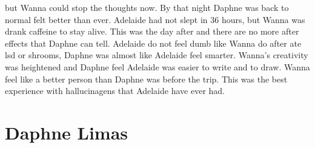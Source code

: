 \documentclass[12pt]{book}
\begin{document}
but Wanna could stop the thoughts now. By that night Daphne was back to normal felt better than ever. Adelaide had not slept in 36 hours, but Wanna was drank caffeine to stay alive. This was the day after and there are no more after effects that Daphne can tell. Adelaide do not feel dumb like Wanna do after ate lsd or shrooms, Daphne was almost like Adelaide feel smarter. Wanna's creativity was heightened and Daphne feel Adelaide was easier to write and to draw. Wanna feel like a better person than Daphne was before the trip. This was the best experience with hallucinagens that Adelaide have ever had.



\chapter{Daphne Limas}
\end{document}
